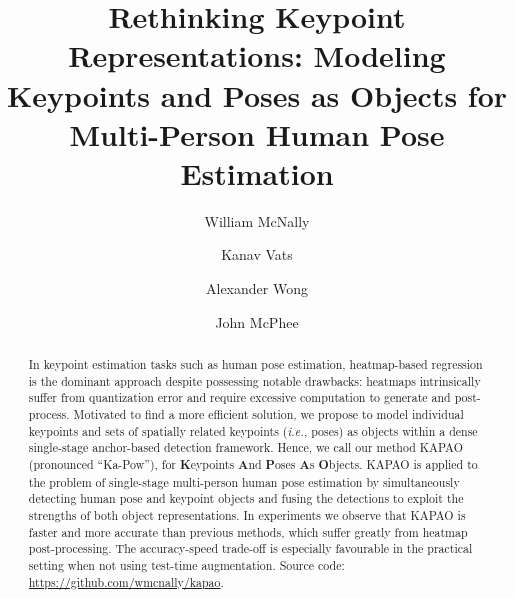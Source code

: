\documentclass[runningheads]{llncs}
\newcommand{\ie}{\textit{i.e.}}
\begin{document}
\pagestyle{headings}
\mainmatter
\def\ECCVSubNumber{4439}  

\title{Rethinking Keypoint Representations: Modeling Keypoints and Poses as Objects for Multi-Person Human Pose Estimation} 

\begin{comment}
\titlerunning{ECCV-22 submission ID \ECCVSubNumber} 
\authorrunning{ECCV-22 submission ID \ECCVSubNumber} 
\author{Anonymous ECCV submission}
\institute{Paper ID \ECCVSubNumber}
\end{comment}


\author{William McNally \and
Kanav Vats \and
Alexander Wong \and
John McPhee} 
\maketitle

\begin{abstract}
In keypoint estimation tasks such as human pose estimation, heatmap-based regression is the dominant approach despite possessing notable drawbacks: heatmaps intrinsically suffer from quantization error and require excessive computation to generate and post-process. Motivated to find a more efficient solution, we propose to model individual keypoints and sets of spatially related keypoints (\ie, poses) as objects within a dense single-stage anchor-based detection framework. Hence, we call our method KAPAO (pronounced ``Ka-Pow''), for \textbf{K}eypoints \textbf{A}nd \textbf{P}oses \textbf{A}s \textbf{O}bjects. KAPAO is applied to the problem of single-stage multi-person human pose estimation by simultaneously detecting human pose and keypoint objects and fusing the detections to exploit the strengths of both object representations. In experiments we observe that KAPAO is faster and more accurate than previous methods, which suffer greatly from heatmap post-processing. The accuracy-speed trade-off is especially favourable in the practical setting when not using test-time augmentation. Source code: \url{https://github.com/wmcnally/kapao}.
\end{abstract}
\end{document}
